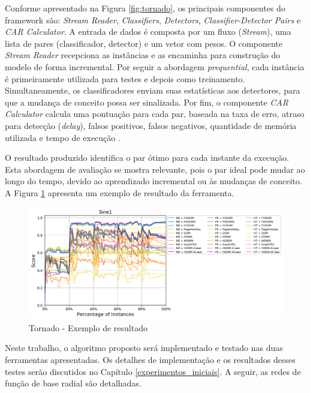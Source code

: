 \documentclass[qual, classic, a4paper]{ufbathesis}
\begin{document}
Conforme apresentado na Figura \ref{fig:tornado}, os principais componentes do framework são: 
\textit{Stream Reader}, \textit{Classifiers}, \textit{Detectors}, \textit{Classifier-Detector Pairs} e \textit{CAR Calculator}.
A entrada de dados é composta por um fluxo (\textit{Stream}), uma lista de pares (classificador, detector) e um vetor com pesos.
O componente \textit{Stream Reader} recepciona as instâncias e as encaminha para construção do modelo de forma incremental. 
Por seguir a abordagem \textit{prequential}, cada instância é primeiramente utilizada para testes e depois como treinamento.
Simultaneamente, os classificadores enviam suas estatísticas aos detectores, para que a mudança de conceito possa ser sinalizada.
Por fim, o componente \textit{CAR Calculator} calcula uma pontuação para cada par, baseada na taxa de erro, atraso para detecção (\textit{delay}), falsos positivos, falsos negativos, quantidade de memória utilizada e tempo de execução \cite{Pesaranghader:Tornado}.

O resultado produzido identifica o par ótimo para cada instante da execução. 
Esta abordagem de avaliação se mostra relevante, pois o par ideal pode mudar ao longo do tempo, devido ao aprendizado incremental ou às mudanças de conceito.
A Figura \ref{fig:tornado_out2} apresenta um exemplo de resultado da ferramenta.

\begin{figure}[ht]
\begin{center}
    \includegraphics[scale=0.6]{imagens/tornado_out2.png}
    \caption{Tornado - Exemplo de resultado \cite{Pesaranghader:Tornado}}
    \label{fig:tornado_out2}
\end{center}
\end{figure}

Neste trabalho, o algoritmo proposto será implementado e testado nas duas ferramentas apresentadas.
Os detalhes de implementação e os resultados desses testes serão discutidos no Capítulo \ref{experimentos_iniciais}.
A seguir, as redes de função de base radial são detalhadas.
\end{document}
